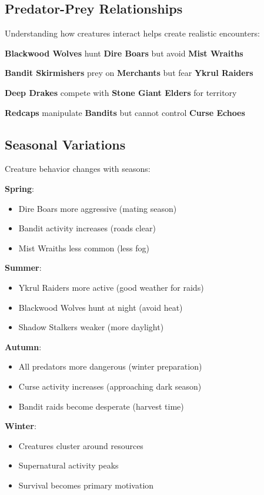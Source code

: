 \documentclass[12pt]{article}
\begin{document}
\begin{itemize}
\subsection*{Predator-Prey Relationships}

Understanding how creatures interact helps create realistic encounters:

\textbf{Blackwood Wolves} hunt \textbf{Dire Boars} but avoid \textbf{Mist Wraiths}

\textbf{Bandit Skirmishers} prey on \textbf{Merchants} but fear \textbf{Ykrul Raiders}

\textbf{Deep Drakes} compete with \textbf{Stone Giant Elders} for territory

\textbf{Redcaps} manipulate \textbf{Bandits} but cannot control \textbf{Curse Echoes}

\subsection*{Seasonal Variations}

Creature behavior changes with seasons:

\textbf{Spring}:
\begin{itemize}
\item Dire Boars more aggressive (mating season)
\item Bandit activity increases (roads clear)
\item Mist Wraiths less common (less fog)
\end{itemize}

\textbf{Summer}:
\begin{itemize}
\item Ykrul Raiders more active (good weather for raids)
\item Blackwood Wolves hunt at night (avoid heat)
\item Shadow Stalkers weaker (more daylight)
\end{itemize}

\textbf{Autumn}:
\begin{itemize}
\item All predators more dangerous (winter preparation)
\item Curse activity increases (approaching dark season)
\item Bandit raids become desperate (harvest time)
\end{itemize}

\textbf{Winter}:
\begin{itemize}
\item Creatures cluster around resources
\item Supernatural activity peaks
\item Survival becomes primary motivation
\end{itemize}


\end{itemize}
\end{document}
